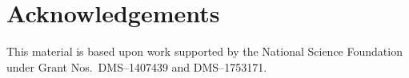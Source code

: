 \documentclass[letterpaper]{article} %
\newcommand{\attn}[1]{\textcolor{red}{TODO: #1}}
\begin{document}


\section*{Acknowledgements}

This material is based upon work supported by the National Science
Foundation under Grant Nos.\ DMS--1407439 and DMS--1753171.

\fontsize{9.0pt}{10.0pt} \selectfont


\end{document}
